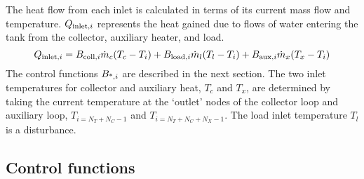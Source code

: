The heat flow from each inlet is calculated in terms of its current mass flow and temperature.
$Q_{\text{inlet}, i}$ represents the heat gained due to flows of water entering the tank from the collector, auxiliary heater, and load.
\begin{equation}
   \label{eq:Q-inlet}
   Q_{\text{inlet}, i} = B_{\text{coll}, i} \dot{m}_c (T_c - T_i)
             + B_{\text{load}, i} \dot{m}_l (T_l - T_i)
             + B_{\text{aux}, i} \dot{m}_x (T_x - T_i)
\end{equation}
The control functions $B_{\text{*}, i}$ are described in the next section.
The two inlet temperatures for collector and auxiliary heat, $T_c$ and $T_x$, are determined by taking the current temperature at the `outlet' nodes of the collector loop and auxiliary loop, $T_{i=N_T+N_C-1}$ and $T_{i=N_T+N_C+N_X-1}$.
The load inlet temperature $T_l$ is a disturbance.

\subsection{Control functions}

